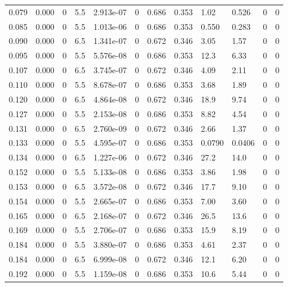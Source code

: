 \documentclass[preview]{standalone}
\begin{document}
{{\begin{tabular}{L{1.2cm}C{1.2cm} C{0.3cm}C{0.5cm} C{1.4cm}C{1.4cm} C{1.4cm}C{1.4cm} C{1.6cm}C{1.6cm} C{1.6cm}C{1.6cm}}
  0.079  &  0.000  & 0     & 5.5 &  2.913e-07  & 0  &  0.686&   0.353& 1.02 & 0.526   &  0 & 0  \\ 
  0.085  &  0.000  & 0     & 5.5 &  1.013e-06  & 0  &  0.686&   0.353& 0.550 & 0.283   &  0 & 0  \\ 
  0.090  &  0.000  & 0     & 6.5 &  1.341e-07  & 0  &  0.672&   0.346& 3.05 & 1.57   &  0 & 0  \\ 
  0.095  &  0.000  & 0     & 5.5 &  5.576e-08  & 0  &  0.686&   0.353& 12.3 & 6.33   &  0 & 0  \\ 
  0.107  &  0.000  & 0     & 6.5 &  3.745e-07  & 0  &  0.672&   0.346& 4.09 & 2.11   &  0 & 0  \\ 
  0.110  &  0.000  & 0     & 5.5 &  8.678e-07  & 0  &  0.686&   0.353& 3.68 & 1.89   &  0 & 0  \\ 
  0.120  &  0.000  & 0     & 6.5 &  4.864e-08  & 0  &  0.672&   0.346& 18.9 & 9.74   &  0 & 0  \\ 
  0.127  &  0.000  & 0     & 5.5 &  2.153e-08  & 0  &  0.686&   0.353& 8.82 & 4.54   &  0 & 0  \\ 
  0.131  &  0.000  & 0     & 6.5 &  2.760e-09  & 0  &  0.672&   0.346& 2.66 & 1.37   &  0 & 0  \\ 
  0.133  &  0.000  & 0     & 5.5 &  4.595e-07  & 0  &  0.686&   0.353& 0.0790 & 0.0406   &  0 & 0  \\ 
  0.134  &  0.000  & 0     & 6.5 &  1.227e-06  & 0  &  0.672&   0.346& 27.2 & 14.0   &  0 & 0  \\ 
  0.152  &  0.000  & 0     & 5.5 &  5.133e-08  & 0  &  0.686&   0.353& 3.86 & 1.98   &  0 & 0  \\ 
  0.153  &  0.000  & 0     & 6.5 &  3.572e-08  & 0  &  0.672&   0.346& 17.7 & 9.10   &  0 & 0  \\ 
  0.154  &  0.000  & 0     & 5.5 &  2.665e-07  & 0  &  0.686&   0.353& 7.00 & 3.60   &  0 & 0  \\ 
  0.165  &  0.000  & 0     & 6.5 &  2.168e-07  & 0  &  0.672&   0.346& 26.5 & 13.6   &  0 & 0  \\ 
  0.169  &  0.000  & 0     & 5.5 &  2.706e-07  & 0  &  0.686&   0.353& 15.9 & 8.19   &  0 & 0  \\ 
  0.184  &  0.000  & 0     & 5.5 &  3.880e-07  & 0  &  0.686&   0.353& 4.61 & 2.37   &  0 & 0  \\ 
  0.184  &  0.000  & 0     & 6.5 &  6.999e-08  & 0  &  0.672&   0.346& 12.1 & 6.20   &  0 & 0  \\ 
  0.192  &  0.000  & 0     & 5.5 &  1.159e-08  & 0  &  0.686&   0.353& 10.6 & 5.44   &  0 & 0  \\ 

\end{tabular}}}
\end{document}
